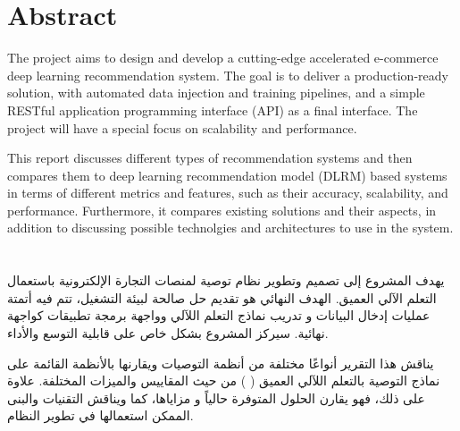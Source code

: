 \cleardoublepage {} {} \mtcaddchapter
\chapter*{Abstract}
The project aims to design and develop a cutting-edge accelerated e-commerce deep learning recommendation system. The goal is to deliver a production-ready solution, with automated data injection and training pipelines, and a simple RESTful application programming interface (API) as a final interface. The project will have a special focus on scalability and performance.

This report discusses different types of recommendation systems and then compares them to deep learning recommendation model (DLRM) based systems in terms of different metrics and features, such as their accuracy, scalability, and performance.
Furthermore, it compares existing solutions and their aspects, in addition to discussing possible technolgies and architectures to use in the system.
\cleardoublepage {} {} \mtcaddchapter
\chapter*{}
\begin{RLtext}
يهدف المشروع إلى تصميم وتطوير نظام توصية لمنصات التجارة الإلكترونية باستعمال التعلم الآلي العميق. الهدف النهائي هو تقديم حل صالحة لبيئة التشغيل، تتم فيه أتمتة عمليات إدخال البيانات و تدريب نماذج التعلم اللآلي وواجهة برمجة تطبيقات 
 كواجهة نهائية. سيركز المشروع بشكل خاص على قابلية التوسع والأداء.

يناقش هذا التقرير أنواعًا مختلفة من أنظمة التوصيات ويقارنها بالأنظمة القائمة على نماذج التوصية بالتعلم اللآلي العميق (
    ) من حيث المقاييس والميزات المختلفة. علاوة على ذلك، فهو يقارن الحلول المتوفرة حالياً و مزاياها، كما ويناقش التقنيات والبنى الممكن استعمالها في تطوير النظام.
\end{RLtext}

\justifying